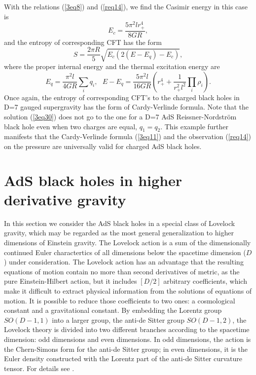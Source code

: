 \documentclass[a4paper,12pt]{article}
\newcommand{\sect}[1]{\setcounter{equation}{0}\section{#1}}
\begin{document}
With the relations (\ref{3eq8}) and (\ref{req14}), we find the Casimir energy 
in this case is
\begin{equation}
E_c =\frac{5\pi^2 lr_+^4}{8GR},
\end{equation}
and the entropy of corresponding CFT has the form
\begin{equation}
\label{3eq36}
S=\frac{2\pi R}{5} \sqrt{E_c(2(E-E_q)-E_c)},
\end{equation}
where the proper internal energy and the thermal excitation  energy are
\begin{equation}
E_q =\frac{\pi^2 l}{4GR}\sum_i q_i, \ \ \  E-E_q=\frac{5\pi^2 l}{16 GR}
  \left( r_+^4 +\frac{1}{r_+^2 l^2}\prod_i \rho_i \right ).
\end{equation}
Once again, the entropy of corresponding CFT's to the charged black holes
in D=7 gauged supergravity has the form of Cardy-Verlinde formula. 
Note that the solution (\ref{3eq30}) does not go to the one for a D=7 AdS 
Reissner-Nordstr\"om black hole even when two charges are equal, $q_1=q_2$. 
This example further manifests that the Cardy-Verlinde formula (\ref{3eq11})
and the observation (\ref{req14}) on the pressure are universally valid
for charged AdS black holes.    



  





\sect{AdS black holes in higher derivative gravity}

In this section we consider the AdS black holes in a special class of
Lovelock gravity, which may be regarded as the most general generalization
to higher dimensions of Einstein gravity. The Lovelock action is a sum of
 the dimensionally continued Euler charactertics of all dimensions below the
spacetime dimension ($D$) under consideration. The Lovelock action has an 
advantage that the resulting equations of motion contain no more than 
second derivatives of metric, as the pure 
Einstein-Hilbert action, but it includes $[D/2]$ arbitrary coefficients, 
which make it difficult to extract physical information from the solutions of 
equations of motion. It is possible to reduce those coefficients to 
two ones: a cosmological constant and a gravitational constant. By embedding 
the Lorentz group $SO(D-1,1)$ into a larger group, the anti-de Sitter 
group $SO(D-1,2)$, the Lovelock theory is divided into two different branches 
according to the spacetime dimension: odd dimensions and even 
dimensions. In odd dimensions, the action is the Chern-Simons form for the 
anti-de Sitter group; in even dimensions, it is the Euler density constructed
with the Lorentz part of the anti-de Sitter curvature tensor. For details 
see \cite{Bano}.
\end{document}
